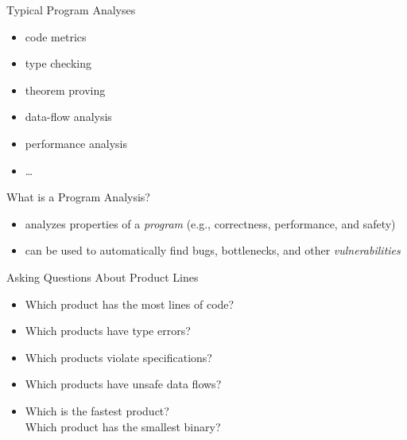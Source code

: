 \begin{frame}{\myframetitle}
	\begin{fancycolumns}[t,widths={47}]
		\begin{note}{Typical Program Analyses}
			\begin{fancycolumns}[c,animation=none]
				\vspace{-3.5ex}
				\begin{itemize}
					\item code metrics
					\item type checking
					\item theorem proving
					\item data-flow analysis
					\item performance analysis
					\item \ldots
				\end{itemize}
			\nextcolumn
				\centering{}
			\end{fancycolumns}
		\end{note}
		\begin{definition}{What is a Program Analysis?}
			\begin{itemize}
				\item analyzes properties of a \emph{program} (e.g., correctness, performance, and safety)
				\item can be used to automatically find bugs, bottlenecks, and other \emph{vulnerabilities}
			\end{itemize}
		\end{definition}
		\nextcolumn
		\pause
		\begin{example}{Asking Questions About Product Lines}
			\begin{itemize}
				\item Which product has the most lines of code? 
				\item Which products have type errors? 
				\item Which products violate specifications? 
				\item Which products have unsafe data flows? 
				\item Which is the fastest product? \\
					Which product has the smallest binary? 

\end{itemize}
\end{example}
\end{fancycolumns}
\end{frame}
